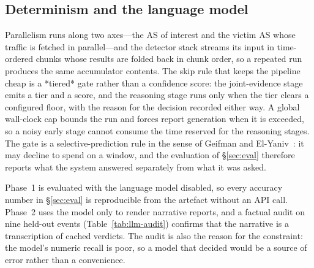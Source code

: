 \subsection{Determinism and the language model}
\label{sec:impl-determinism}

Parallelism runs along two axes---the AS of interest and the victim AS
whose traffic is fetched in parallel---and the detector stack streams
its input in time-ordered chunks whose results are folded back in chunk
order, so a repeated run produces the same accumulator contents. The
skip rule that keeps the pipeline cheap is a *tiered* gate rather than
a confidence score: the joint-evidence stage emits a tier and a score,
and the reasoning stage runs only when the tier clears a configured
floor, with the reason for the decision recorded either way. A global
wall-clock cap bounds the run and forces report generation when it is
exceeded, so a noisy early stage cannot consume the time reserved for
the reasoning stages. The gate is a selective-prediction rule in the
sense of Geifman and El-Yaniv~\cite{geifman-2017-selective}: it may
decline to spend on a window, and the evaluation of \S\ref{sec:eval}
therefore reports what the system answered separately from what it was
asked.

Phase~1 is evaluated with the language model disabled, so every
accuracy number in \S\ref{sec:eval} is reproducible from the artefact
without an API call. Phase~2 uses the model only to render narrative
reports, and a factual audit on nine held-out events
(Table~\ref{tab:llm-audit}) confirms that the narrative is a
transcription of cached verdicts. The audit is also the reason for the
constraint: the model's numeric recall is poor, so a model that decided
would be a source of error rather than a convenience.
